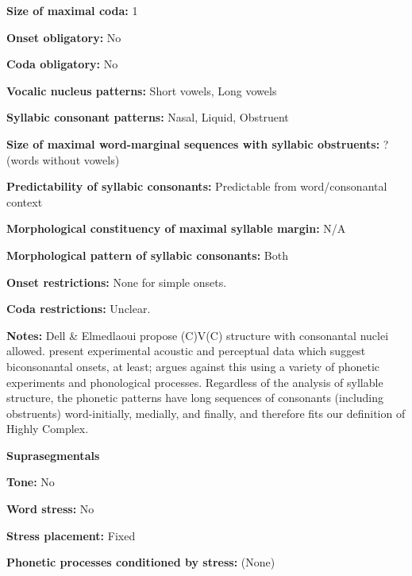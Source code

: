 \textbf{Size of maximal coda:} 1



\textbf{Onset obligatory:} No



\textbf{Coda obligatory:} No



\textbf{Vocalic nucleus patterns:} Short vowels, Long vowels



\textbf{Syllabic consonant patterns:} Nasal, Liquid, Obstruent



\textbf{Size of maximal word{}-marginal sequences with syllabic obstruents:} ? (words without vowels)



\textbf{Predictability of syllabic consonants:} Predictable from word/consonantal context



\textbf{Morphological constituency of maximal syllable margin:} N/A



\textbf{Morphological pattern of syllabic consonants:} Both



\textbf{Onset restrictions:} None for simple onsets.



\textbf{Coda restrictions:} Unclear.



\textbf{Notes:} Dell \& Elmedlaoui propose (C)V(C) structure with consonantal nuclei allowed. \citet{PuechLouali1999} present experimental acoustic and perceptual data which suggest biconsonantal onsets, at least; \citet{Ridouane2008} argues against this using a variety of phonetic experiments and phonological processes. Regardless of the analysis of syllable structure, the phonetic patterns have long sequences of consonants (including obstruents) word-initially, medially, and finally, and therefore fits our definition of Highly Complex.



\textbf{Suprasegmentals}



\textbf{Tone:} No



\textbf{Word stress:} No



\textbf{Stress placement:} Fixed



\textbf{Phonetic processes conditioned by stress:} (None)



